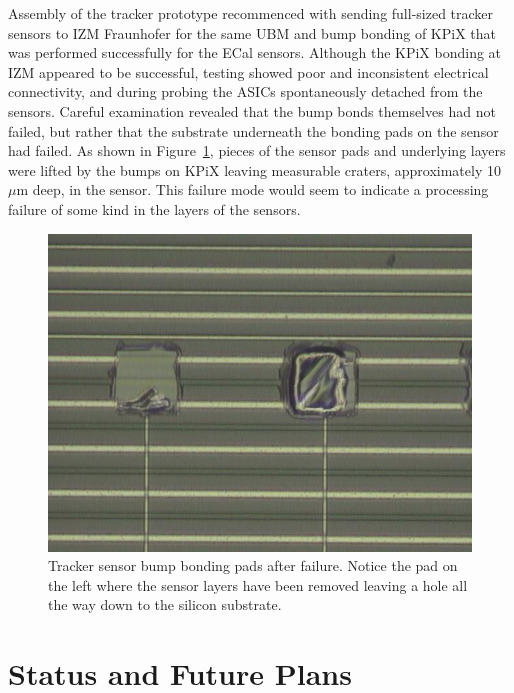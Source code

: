 \documentclass[prc,12pt,nofootinbib,letterpaper]{revtex4}
\begin{document}
Assembly of the tracker prototype recommenced with sending full-sized tracker sensors to IZM Fraunhofer for the same UBM and bump bonding of KPiX that was performed successfully for the ECal sensors.  Although the KPiX bonding at IZM appeared to be successful, testing showed poor and inconsistent electrical connectivity, and during probing the ASICs spontaneously detached from the sensors. Careful examination revealed that the bump bonds themselves had not failed, but rather that the substrate underneath the bonding pads on the sensor had failed.  As shown in Figure~\ref{fig:kpix_bump}, pieces of the sensor pads and underlying layers were lifted by the bumps on KPiX leaving measurable craters, approximately 10 $\mu$m deep, in the sensor. This failure mode would seem to indicate a processing failure of some kind in the layers of the sensors.
\begin{figure}[htb]
\begin{center}
    \includegraphics[width=5in]{figures/Kpix_Bump8}
\caption{Tracker sensor bump bonding pads after failure. Notice the pad on the left where the sensor layers have been removed leaving a hole all the way down to the silicon substrate.}
\label{fig:kpix_bump}
\end{center}
\end{figure}

\section{Status and Future Plans}
\end{document}
